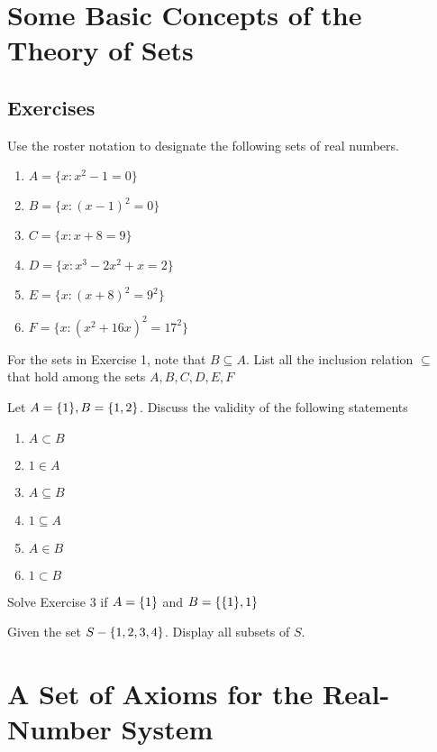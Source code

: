 \documentclass{report}
\begin{document}
\section{Some Basic Concepts of the Theory of Sets}
\subsection{Exercises}
\begin{question}{}{}
Use the roster notation to designate the following sets of real numbers.
\begin{enumerate}[label=(\alph*)]
  \item $A=\{x:x^2-1=0\}$ 
  \item $B=\{x:(x-1)^2=0\}$ 
  \item $C=\{x:x+8=9\}$
  \item $D=\{x:x^3-2x^2+x=2\}$ 
  \item $E=\{x:(x+8)^2=9^2\}$ 
  \item $F=\{x:(x^2+16x)^2=17^2\}$
\end{enumerate}
\end{question}
\begin{question}{}{}
For the sets in Exercise 1, note that $B\subseteq A$. List all the inclusion relation $\subseteq$ that hold among the sets $A,B,C,D,E,F$
\end{question}
\begin{question}{}{}
Let $A=\{ 1 \},B=\{ 1,2 \}$. Discuss the validity of the following statements
\begin{enumerate}[label=(\alph*)]
  \item $A\subset B$
    \item $1\in A$
      \item $A\subseteq B$ 
        \item $1\subseteq A$
          \item $A\in B$
            \item $1 \subset B$\\
\end{enumerate}
\end{question}
\begin{question}{}{}
Solve Exercise 3 if $A=\{ 1 \}$ and $B=\{ \{ 1 \},1 \}$
\end{question}
\begin{question}{}{}
Given the set $S-\{ 1,2,3,4 \}$. Display all subsets of $S$.
\end{question}
\section{A Set of Axioms  for the Real-Number System}
\end{document}
